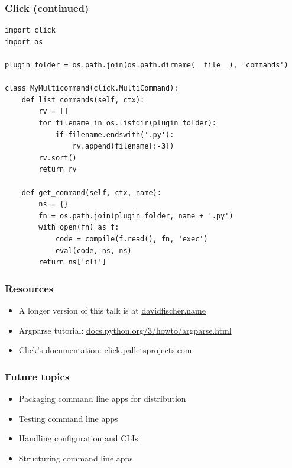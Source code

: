 \documentclass[aspectratio=169]{beamer}
\begin{document}
\begin{frame}[fragile]
\frametitle{Click (continued)}

{\tiny
\begin{verbatim}
import click
import os

plugin_folder = os.path.join(os.path.dirname(__file__), 'commands')

class MyMulticommand(click.MultiCommand):
    def list_commands(self, ctx):
        rv = []
        for filename in os.listdir(plugin_folder):
            if filename.endswith('.py'):
                rv.append(filename[:-3])
        rv.sort()
        return rv

    def get_command(self, ctx, name):
        ns = {}
        fn = os.path.join(plugin_folder, name + '.py')
        with open(fn) as f:
            code = compile(f.read(), fn, 'exec')
            eval(code, ns, ns)
        return ns['cli']
\end{verbatim}
}

\end{frame}



\begin{frame}
\frametitle{Resources}
  \begin{itemize}
    \item {\small A longer version of this talk is at \href{https://www.davidfischer.name}{davidfischer.name}}
    \item {\small Argparse tutorial: \href{https://docs.python.org/3/howto/argparse.html}{docs.python.org/3/howto/argparse.html}}
    \item {\small Click's documentation: \href{https://click.palletsprojects.com/}{click.palletsprojects.com}}
  \end{itemize}
\end{frame}


\begin{frame}
\frametitle{Future topics}
  \begin{itemize}
    \item {\small Packaging command line apps for distribution}
    \item {\small Testing command line apps}
    \item {\small Handling configuration and CLIs}
    \item {\small Structuring command line apps}
  \end{itemize}
\end{frame}
\end{document}
